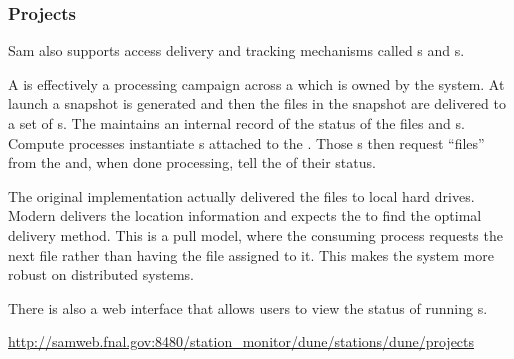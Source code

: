 \documentclass[../main-v1.tex]{subfiles}
\begin{document}

\subsubsection{Projects}


Sam also supports access delivery and  tracking mechanisms called s and s.

A  is effectively a processing campaign across a  which is owned by the  system. At launch a snapshot is generated and then the files in the snapshot are delivered to a set of s.  The  maintains an internal record of the status of the files and s. Compute processes instantiate s attached to the .  Those s then request “files” from the  and, when done processing, tell the  of their status.  

The original  implementation actually delivered the files to local hard drives.  Modern  delivers the location information and expects the  to find the optimal delivery method. This is a pull model, where the consuming process requests the next file rather than having the file assigned to it.  This makes the system more robust on distributed systems. 

There is also a web interface that allows users to view the status of running s. 

\href{http://samweb.fnal.gov:8480/station_monitor/dune/stations/dune/projects}{http://samweb.fnal.gov:8480/station\_monitor/dune/stations/dune/projects}





\end{document}

